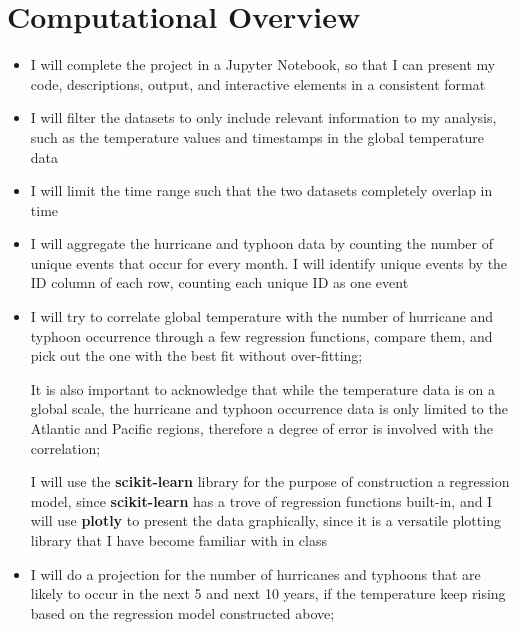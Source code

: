 \documentclass[fontsize=11pt]{article}
\begin{document}
\section*{Computational Overview}
\begin{itemize}
    \item I will complete the project in a Jupyter Notebook, so that I can present my code, descriptions, output, and interactive elements in a consistent format

    \item I will filter the datasets to only include relevant information to my analysis, such as the temperature values and timestamps in the global temperature data

    \item I will limit the time range such that the two datasets completely overlap in time


    \item I will aggregate the hurricane and typhoon data by counting the number of unique events that occur for every month. I will identify unique events by the ID column of each row, counting each unique ID as one event

    \item I will try to correlate global temperature with the number of hurricane and typhoon occurrence through a few regression functions, compare them, and pick out the one with the best fit without over-fitting;

    It is also important to acknowledge that while the temperature data is on a global scale, the hurricane and typhoon occurrence data is only limited to the Atlantic and Pacific regions, therefore a degree of error is involved with the correlation;

    I will use the \textbf{scikit-learn} library for the purpose of construction a regression model, since \textbf{scikit-learn} has a trove of regression functions built-in, and I will use \textbf{plotly} to present the data graphically, since it is a versatile plotting library that I have become familiar with in class

    \item I will do a projection for the number of hurricanes and typhoons that are likely to occur in the next 5 and next 10 years, if the temperature keep rising based on the regression model constructed above;


\end{itemize}
\end{document}
